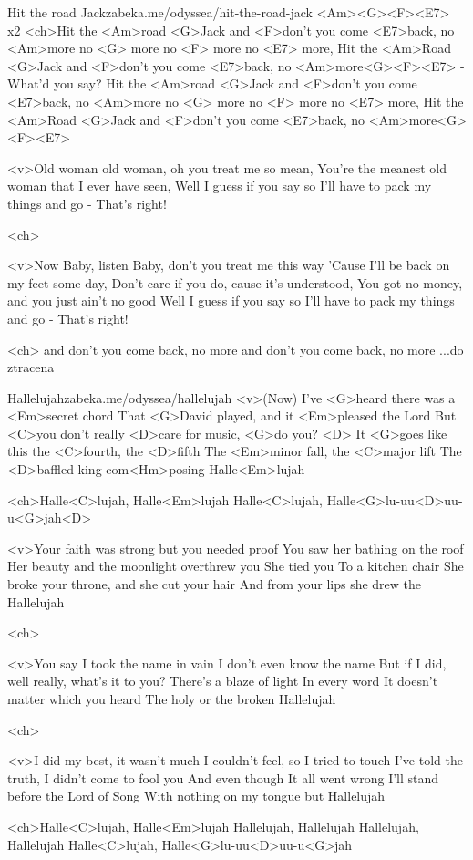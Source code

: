 \begin{song}{44}{Hit the road Jack}{zabeka.me/odyssea/hit-the-road-jack}
<Am><G><F><E7> x2
<ch>Hit the <Am>road <G>Jack and <F>don't you come <E7>back, 
no <Am>more no <G> more no <F> more no <E7> more,
Hit the <Am>Road <G>Jack and <F>don't you come <E7>back,
no <Am>more<G><F><E7> - What'd you say?
Hit the <Am>road <G>Jack and <F>don't you come <E7>back,
no <Am>more no <G> more no <F> more no <E7> more,
Hit the <Am>Road <G>Jack and <F>don't you come <E7>back,
no <Am>more<G><F><E7>

<v>Old woman old woman, oh you treat me so mean,
You're the meanest old woman that I ever have seen,
Well I guess if you say so
I'll have to pack my things and go - That's right!

<ch>

<v>Now Baby, listen Baby, don't you treat me this way
'Cause I'll be back on my feet some day,
Don't care if you do, cause it's understood,
You got no money, and you just ain't no good
Well I guess if you say so
I'll have to pack my things and go - That's right!

<ch>
and don't you come back, no more
and don't you come back, no more ...do ztracena
\end{song}
\begin{song}{45}{Hallelujah}{zabeka.me/odyssea/hallelujah}
<v>(Now) I've <G>heard there was a <Em>secret chord
That <G>David played, and it <Em>pleased the Lord
But <C>you don't really <D>care for music, <G>do you? <D>
It <G>goes like this the <C>fourth, the <D>fifth 
The <Em>minor fall, the <C>major lift
The <D>baffled king com<Hm>posing Halle<Em>lujah

<ch>Halle<C>lujah, Halle<Em>lujah
Halle<C>lujah, Halle<G>lu-uu<D>uu-u<G>jah<D>

<v>Your faith was strong but you needed proof
You saw her bathing on the roof
Her beauty and the moonlight overthrew you
She tied you
To a kitchen chair
She broke your throne, and she cut your hair
And from your lips she drew the Hallelujah

<ch>

<v>You say I took the name in vain
I don't even know the name
But if I did, well really, what's it to you?
There's a blaze of light
In every word
It doesn't matter which you heard
The holy or the broken Hallelujah

<ch>

<v>I did my best, it wasn't much
I couldn't feel, so I tried to touch
I've told the truth, I didn't come to fool you
And even though
It all went wrong
I'll stand before the Lord of Song
With nothing on my tongue but Hallelujah

<ch>Halle<C>lujah, Halle<Em>lujah
Hallelujah, Hallelujah
Hallelujah, Hallelujah
Halle<C>lujah, Halle<G>lu-uu<D>uu-u<G>jah 
\end{song}
